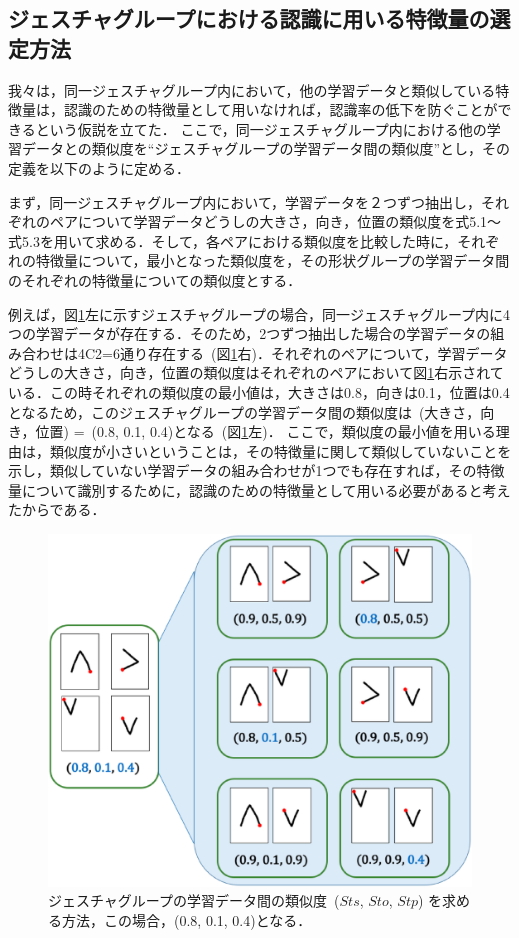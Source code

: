 \subsection{ジェスチャグループにおける認識に用いる特徴量の選定方法}
我々は，同一ジェスチャグループ内において，他の学習データと類似している特徴量は，認識のための特徴量として用いなければ，認識率の低下を防ぐことができるという仮説を立てた．
ここで，同一ジェスチャグループ内における他の学習データとの類似度を``ジェスチャグループの学習データ間の類似度''とし，その定義を以下のように定める．

まず，同一ジェスチャグループ内において，学習データを２つずつ抽出し，それぞれのペアについて学習データどうしの大きさ，向き，位置の類似度を式5.1〜式5.3を用いて求める．そして，各ペアにおける類似度を比較した時に，それぞれの特徴量について，最小となった類似度を，その形状グループの学習データ間のそれぞれの特徴量についての類似度とする．

例えば，図\ref{fig:group_similarity}左に示すジェスチャグループの場合，同一ジェスチャグループ内に4つの学習データが存在する．そのため，2つずつ抽出した場合の学習データの組み合わせは{\scriptsize 4}C{\scriptsize 2}=6通り存在する~(図\ref{fig:group_similarity}右)．それぞれのペアについて，学習データどうしの大きさ，向き，位置の類似度はそれぞれのペアにおいて図\ref{fig:group_similarity}右示されている．この時それぞれの類似度の最小値は，大きさは0.8，向きは0.1，位置は0.4となるため，このジェスチャグループの学習データ間の類似度は~(大きさ，向き，位置) =~(0.8, 0.1, 0.4)となる~(図\ref{fig:group_similarity}左)．
ここで，類似度の最小値を用いる理由は，類似度が小さいということは，その特徴量に関して類似していないことを示し，類似していない学習データの組み合わせが1つでも存在すれば，その特徴量について識別するために，認識のための特徴量として用いる必要があると考えたからである．

\begin{figure} [h!]
	\begin{center}
		\includegraphics [width=0.8\hsize ]{img/group_similarity.eps}
	\end{center}
	\caption{ジェスチャグループの学習データ間の類似度~($Sts$, $Sto$, $Stp$) を求める方法，この場合，(0.8, 0.1, 0.4)となる．}
	\label{fig:group_similarity}
\end{figure}

